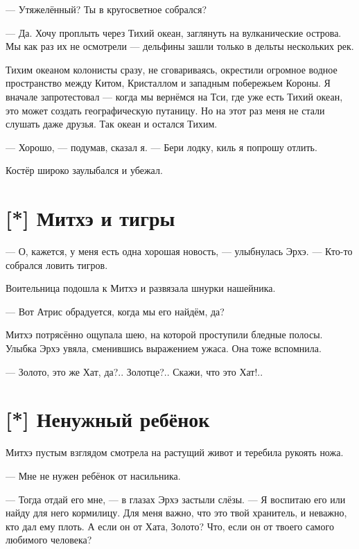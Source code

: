 --- Утяжелённый?
Ты в кругосветное собрался?

--- Да.
Хочу проплыть через Тихий океан, заглянуть на вулканические острова.
Мы как раз их не осмотрели --- дельфины зашли только в дельты нескольких рек.

Тихим океаном колонисты сразу, не сговариваясь, окрестили огромное водное пространство между Китом, Кристаллом и западным побережьем Короны.
Я вначале запротестовал --- когда мы вернёмся на Тси, где уже есть Тихий океан, это может создать географическую путаницу.
Но на этот раз меня не стали слушать даже друзья.
Так океан и остался Тихим\FM.

--- Хорошо, --- подумав, сказал я.
--- Бери лодку, киль я попрошу отлить.

Костёр широко заулыбался и убежал.

\section{[*] Митхэ и тигры}

\textspace

--- О, кажется, у меня есть одна хорошая новость, --- улыбнулась Эрхэ.
--- Кто-то собрался ловить тигров.

Воительница подошла к Митхэ и развязала шнурки нашейника.

--- Вот Атрис обрадуется, когда мы его найдём, да?

Митхэ потрясённо ощупала шею, на которой проступили бледные полосы.
Улыбка Эрхэ увяла, сменившись выражением ужаса.
Она тоже вспомнила.

--- Золото, это же Хат, да?..
Золотце?..
Скажи, что это Хат!..

\section{[*] Ненужный ребёнок}

\textspace

Митхэ пустым взглядом смотрела на растущий живот и теребила рукоять ножа.

--- Мне не нужен ребёнок от насильника.

--- Тогда отдай его мне, --- в глазах Эрхэ застыли слёзы.
--- Я воспитаю его или найду для него кормилицу.
Для меня важно, что это твой хранитель, и неважно, кто дал ему плоть.
А если он от Хата, Золото?
Что, если он от твоего самого любимого человека?

